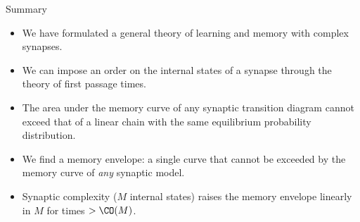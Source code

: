 \documentclass[final,hyperref={pdfpagelabels=false,bookmarks=false}]{beamer}
\DeclareMathOperator{\SNR}{SNR}
\begin{document}
\begin{frame}{}
\begin{columns}[t]
\begin{column}{0.33\linewidth}
%
%
%
%



\begin{block}{Summary}
%
  \begin{itemize}
    \item We have formulated a general theory of learning and memory with complex synapses.
    \item We can impose an order on the internal states of a synapse through the theory of first passage times.
    \item The area under the memory curve of any synaptic transition diagram cannot exceed that of a linear chain with the same equilibrium probability distribution.
    \item We find a memory envelope: a single curve that cannot be exceeded by the memory curve of \emph{any} synaptic model.
    \item    Synaptic complexity ($M$ internal states) raises the memory envelope linearly in $M$ for times $> \CO(M)$.
  \end{itemize}
%
\end{block}


\end{column}
\end{columns}
\end{frame}
\end{document}
